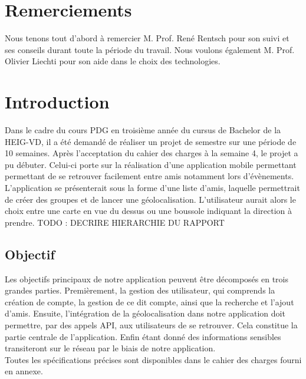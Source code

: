 \documentclass[french]{article}
\begin{document}
	\newpage
	
	\section*{Remerciements}
	Nous tenons tout d'abord à remercier M. Prof. René Rentsch pour son suivi et ses conseils durant toute la période du travail. Nous voulons également M. Prof. Olivier Liechti pour son aide dans le choix des technologies.
	
	\section{Introduction}
	Dans le cadre du cours PDG en troisième année du cursus de Bachelor de la HEIG-VD, il a été demandé de réaliser un projet de semestre sur une période de 10 semaines. Après l'acceptation du cahier des charges à la semaine 4, le projet a pu débuter. Celui-ci porte sur la réalisation d'une application mobile permettant permettant de se retrouver facilement entre amis notamment lors d'évènements. L’application se présenterait sous la forme d’une liste d’amis, laquelle permettrait de créer des groupes et de lancer une géolocalisation. L’utilisateur aurait alors le choix entre une carte en vue du dessus ou une boussole indiquant la direction à
	prendre.
	TODO : DECRIRE HIERARCHIE DU RAPPORT
	
		\subsection{Objectif}
		Les objectifs principaux de notre application peuvent être décomposés en trois grandes parties. Premièrement, la gestion des utilisateur, qui comprends la création de compte, la gestion de ce dit compte, ainsi que la recherche et l'ajout d'amis. Ensuite, l'intégration de la géolocalisation dans notre application doit permettre, par des appels API, aux utilisateurs de se retrouver. Cela constitue la partie centrale de l'application. Enfin étant donné des informations sensibles transiteront sur le réseau par le biais de notre application.\\
		Toutes les spécifications précises sont disponibles dans le cahier des charges fourni en annexe.
		
\end{document}
